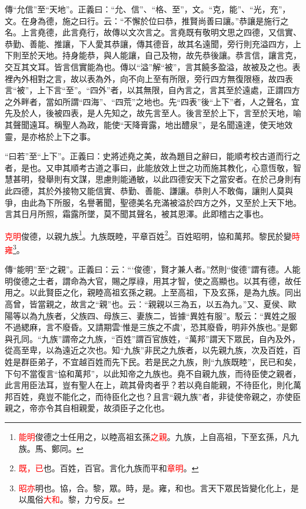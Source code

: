 {\noindent\zhuan{}\fzbyks 傳“允信”至“天地”。正義曰：“允、信”、“格、至”，文。“克，能”、“光，充”，文。在身為德，施之曰行。云：“不懈於位曰恭，推賢尚善曰讓。”恭讓是施行之名。上言堯德，此言堯行，故傳以文次言之。言堯既有敬明文思之四德，又信實、恭勤、善能、推讓，下人愛其恭讓，傳其德音，故其名遠聞，旁行則充溢四方，上下則至於天地。持身能恭，與人能讓，自己及物，故先恭後讓。恭言信，讓言克，交互其文耳。皆言信實能為也。傳以“溢”解“被”，言其饒多盈溢，故被及之也。表裡內外相對之言，故以表為外，向不向上至有所限，旁行四方無復限極，故四表言“被”，上下言“至”。“四外”者，以其無限，自內言之，言其至於遠處，正謂四方之外畔者，當如所謂“四海”、“四荒”之地也。先“四表”後“上下”者，人之聲名，宜先及於人，後被四表，是人先知之，故先言至人。後言至於上下，言至於天地，喻其聲聞遠耳。稱聖人為政，能使“天降膏露，地出醴泉”，是名聞遠達，使天地效靈，是亦格於上下之事。 \par}

{\noindent\shu{}\fzkt “曰若”至“上下”。正義曰：史將述堯之美，故為題目之辭曰，能順考校古道而行之者，是也。又申其順考古道之事曰，此能放效上世之功而施其教化，心意恆敬，智慧甚明，發舉則有文謀，思慮則能通敏，以此四德安天下之當安者。在於己身則有此四德，其於外接物又能信實、恭勤、善能、謙讓。恭則人不敢侮，讓則人莫與爭，由此為下所服，名譽著聞，聖德美名充滿被溢於四方之外，又至於上天下地。言其日月所照，霜露所墜，莫不聞其聲名，被其恩澤。此即稽古之事也。 \par}


\textcolor{red}{克明}俊德，以親九族\footnote{\textcolor{red}{能明}俊德之士任用之，以睦高祖玄孫\textcolor{red}{之親}。九族，上自高祖，下至玄孫，凡九族。馬、鄭同。}。九族既睦，平章百姓\footnote{\textcolor{red}{既，已}也。百姓，百官。言化九族而平和\textcolor{red}{章明}。}。百姓昭明，協和萬邦。黎民於變\textcolor{red}{時雍}\footnote{\textcolor{red}{昭亦}明也。協，合。黎，眾。時，是。雍，和也。言天下眾民皆變化化上，是以風俗\textcolor{red}{大和}。黎，力兮反。}。

{\noindent\zhuan{}\fzbyks 傳“能明”至“之親”。正義曰：云：“‘俊德’，賢才兼人者。”然則“俊德”謂有德。人能明俊德之士者，謂命為大官，賜之厚祿，用其才智，使之高顯也。以其有德，故任用之。以此賢臣之化，親睦高祖玄孫之親。上至高祖，下及玄孫，是為九族。同出高曾，皆當親之，故言之“親”也。云：“親親以三為五，以五為九。”又、夏侯、歐陽等以為九族者，父族四、母族三、妻族二，皆據“異姓有服”。駁云：“異姓之服不過緦麻，言不廢昏。又請期雲‘惟是三族之不虞’，恐其廢昏，明非外族也。”是鄭與孔同。“九族”謂帝之九族，“百姓”謂百官族姓，“萬邦”謂天下眾民，自內及外，從高至卑，以為遠近之次也。知“九族”非民之九族者，以先親九族，次及百姓，百姓是群臣弟子，不宜越百姓而先下民。若是民之九族，則“九族既睦”，民已和矣，下句不當復言“協和萬邦”，以此知帝之九族也。堯不自親九族，而待臣使之親者，此言用臣法耳，豈有聖人在上，疏其骨肉者乎？若以堯自能親，不待臣化，則化萬邦百姓，堯豈不能化之，而待臣化之也？且言“親九族”者，非徒使帝親之，亦使臣親之，帝亦令其自相親愛，故須臣子之化也。 \par}

